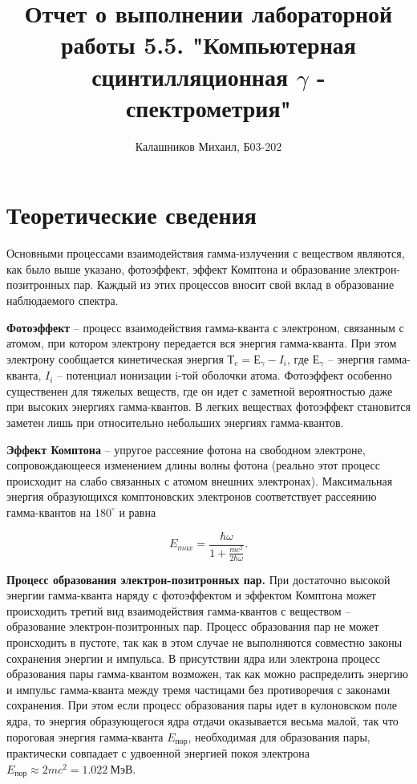 \documentclass[14pt, a4paper]{report}
\title{\textbf{Отчет о выполнении лабораторной работы 5.5. "Компьютерная сцинтилляционная $\gamma$ - спектрометрия"}}
\author{Калашников Михаил, Б03-202}
\date{}
\begin{document}
\maketitle


\section{Теоретические сведения}

Основными процессами взаимодействия гамма-излучения с веществом являются, как было выше указано, фотоэффект, эффект Комптона и образование электрон-позитронных пар. Каждый из этих процессов вносит свой вклад в образование наблюдаемого спектра.

\textbf{Фотоэффект} -- процесс взаимодействия гамма-кванта с электроном, связанным с атомом, при котором электрону передается вся энергия гамма-кванта. При этом электрону сообщается кинетическая энергия $Т_e = Е_\gamma-I_i$, где $Е_\gamma$ -- энергия гамма-кванта, $I_i$ -- потенциал ионизации i-той оболочки атома. Фотоэффект особенно существенен для тяжелых веществ, где он идет с заметной вероятностью даже при высоких энергиях гамма-квантов. В легких веществах фотоэффект становится заметен лишь при относительно небольших энергиях гамма-квантов.

\textbf{Эффект Комптона} -- упругое рассеяние фотона на свободном электроне, сопровождающееся изменением длины волны фотона (реально этот процесс происходит на слабо связанных с атомом внешних электронах). Максимальная энергия образующихся комптоновских электронов соответствует рассеянию гамма-квантов на $180^\circ$ и равна

\[E_{max}=\frac{\hbar\omega}{1+\frac{mc^2}{2\hbar\omega}}\text{.}\]

\textbf{Процесс образования электрон-позитронных пар.} При достаточно высокой энергии гамма-кванта наряду с фотоэффектом и эффектом Комптона может происходить третий вид взаимодействия гамма-квантов с веществом -- образование электрон-позитронных пар. Процесс образования пар не может происходить в пустоте, так как в этом случае не выполняются совместно законы сохранения энергии и импульса. В присутствии ядра или электрона процесс образования пары гамма-квантом возможен, так как можно распределить энергию и импульс гамма-кванта между тремя частицами без противоречия с законами сохранения. При этом если процесс образования пары идет в кулоновском поле ядра, то энергия образующегося ядра отдачи оказывается весьма малой, так что пороговая энергия гамма-кванта $E_{пор}$, необходимая для образования пары, практически совпадает с удвоенной энергией покоя электрона $E_{пор}\approx 2mc^2 =1.022\ МэВ$.
\end{document}

